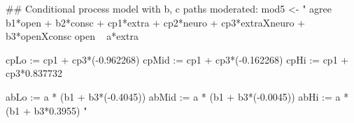\begin{Schunk}
\begin{Sinput}
 ## Conditional process model with b, c paths moderated:
 mod5 <- "
 agree ~ b1*open + b2*consc + cp1*extra + cp2*neuro + 
         cp3*extraXneuro + b3*openXconsc
 open ~ a*extra
 
 cpLo  := cp1 + cp3*(-0.962268)
 cpMid := cp1 + cp3*(-0.162268)
 cpHi  := cp1 + cp3*0.837732
 
 abLo := a * (b1 + b3*(-0.4045))
 abMid := a * (b1 + b3*(-0.0045))
 abHi := a * (b1 + b3*0.3955)
 "
\end{Sinput}
\end{Schunk}
